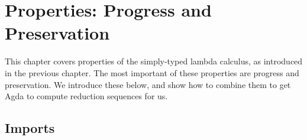 \hypertarget{Properties}{%
\chapter{Properties: Progress and Preservation}\label{Properties}}

\begin{fence}
\begin{code}%
\>[0]\AgdaSpace{}%
\AgdaSpace{}%
\<%
\end{code}
\end{fence}

This chapter covers properties of the simply-typed lambda calculus, as
introduced in the previous chapter. The most important of these
properties are progress and preservation. We introduce these below, and
show how to combine them to get Agda to compute reduction sequences for
us.

\hypertarget{imports}{%
\section{Imports}\label{imports}}

